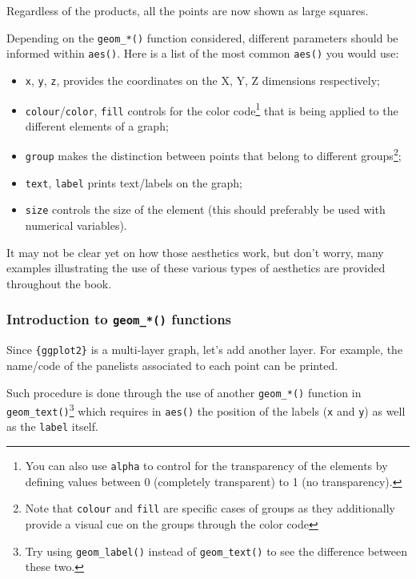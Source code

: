 \documentclass[
]{krantz}
\providecommand{\tightlist}{%
  \setlength{\itemsep}{0pt}\setlength{\parskip}{0pt}}
\begin{document}
Regardless of the products, all the points are now shown as large squares.

Depending on the \texttt{geom\_*()} function considered, different parameters should be informed within \texttt{aes()}. Here is a list of the most common \texttt{aes()} you would use:

\begin{itemize}
\tightlist
\item
  \texttt{x}, \texttt{y}, \texttt{z}, provides the coordinates on the X, Y, Z dimensions respectively;
\item
  \texttt{colour}/\texttt{color}, \texttt{fill} controls for the color code\footnote{You can also use \texttt{alpha} to control for the transparency of the elements by defining values between 0 (completely transparent) to 1 (no transparency).} that is being applied to the different elements of a graph;
\item
  \texttt{group} makes the distinction between points that belong to different groups\footnote{Note that \texttt{colour} and \texttt{fill} are specific cases of groups as they additionally provide a visual cue on the groups through the color code};
\item
  \texttt{text}, \texttt{label} prints text/labels on the graph;
\item
  \texttt{size} controls the size of the element (this should preferably be used with numerical variables).
\end{itemize}

It may not be clear yet on how those aesthetics work, but don't worry, many examples illustrating the use of these various types of aesthetics are provided throughout the book.

\hypertarget{linechart}{%
\subsubsection*{\texorpdfstring{Introduction to \texttt{geom\_*()} functions}{Introduction to geom\_*() functions}}\label{linechart}}


Since \texttt{\{ggplot2\}} is a multi-layer graph, let's add another layer. For example, the name/code of the panelists associated to each point can be printed.

Such procedure is done through the use of another \texttt{geom\_*()} function in \texttt{geom\_text()}\footnote{Try using \texttt{geom\_label()} instead of \texttt{geom\_text()} to see the difference between these two.} which requires in \texttt{aes()} the position of the labels (\texttt{x} and \texttt{y}) as well as the \texttt{label} itself.
\end{document}
